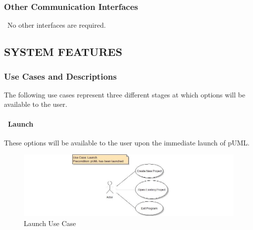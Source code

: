 \documentclass[twoside,letterpaper]{article}
\begin{document}
\subsubsection[Other Communication
Interfaces]{\rmfamily\bfseries
Other Communication Interfaces}
{
\foreignlanguage{english}{\ }\foreignlanguage{english}{No other interfaces are required. }}



\bigskip


\bigskip

\bigskip









\clearpage\setcounter{page}{1}\pagestyle{Convertv}
\subsection[SYSTEM FEATURES]{\rmfamily\bfseries
SYSTEM FEATURES}





\subsubsection{Use Cases and Descriptions}
{The following use cases represent three different stages at which options will be available to the user.}

\bigskip
\bigskip

\paragraph[\ Use Category]
{\ Launch} {These options will be available to the user upon the immediate launch of pUML.}

\begin{figure}[h]
\centering
\includegraphics[width=6.0in]{ucaseLaunch.jpg}
\caption{Launch Use Case}
\end{figure}
\end{document}
